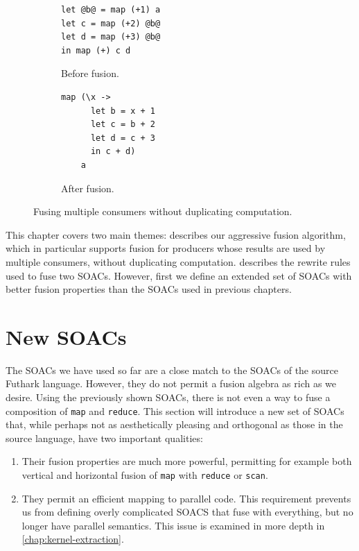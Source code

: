 \begin{figure}
\begin{subfigure}[b]{0.4\textwidth}
\begin{lstlisting}[xleftmargin=0pt]
let @b@ = map (+1) a
let c = map (+2) @b@
let d = map (+3) @b@
in map (+) c d
\end{lstlisting}
\caption{Before fusion.}
\end{subfigure}%
\hspace{.1\textwidth}
\begin{subfigure}[b]{0.4\textwidth}
\begin{lstlisting}[xleftmargin=0pt]
map (\x ->
      let b = x + 1
      let c = b + 2
      let d = c + 3
      in c + d)
    a
\end{lstlisting}
\caption{After fusion.}
\end{subfigure}%
\caption{Fusing multiple consumers without duplicating computation.}
\label{fig:fusion-multiple-consumers}
\end{figure}

This chapter covers two main themes: 
describes our aggressive fusion algorithm, which in particular
supports fusion for producers whose results are used by multiple
consumers, without duplicating computation.  
describes the rewrite rules used to fuse two SOACs.  However, first we
define an extended set of SOACs with better fusion properties than the
SOACs used in previous chapters.

\section{New SOACs}
\label{sec:fusion-in-futhark}

The SOACs we have used so far are a close match to the SOACs of the
source Futhark language.  However, they do not permit a fusion algebra
as rich as we desire.  Using the previously shown SOACs, there is not
even a way to fuse a composition of \lstinline{map} and
\lstinline{reduce}.  This section will introduce a new set of SOACs
that, while perhaps not as aesthetically pleasing and orthogonal as
those in the source language, have two important qualities:

\begin{enumerate}
\item Their fusion properties are much more powerful, permitting for
  example both vertical and horizontal fusion of \lstinline{map} with
  \lstinline{reduce} or \lstinline{scan}.
\item They permit an efficient mapping to parallel code.  This
  requirement prevents us from defining overly complicated SOACS that
  fuse with everything, but no longer have parallel semantics.  This
  issue is examined in more depth in \cref{chap:kernel-extraction}.
\end{enumerate}


